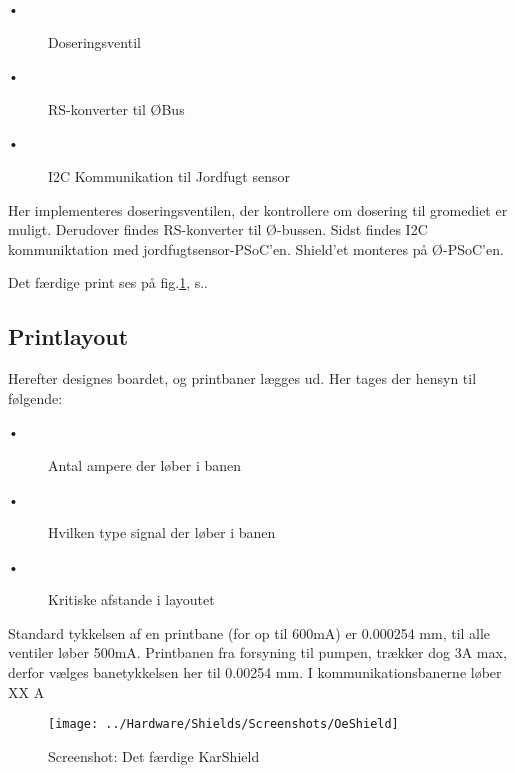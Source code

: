 \begin{description}
 \item[•] Doseringsventil
 \item[•] RS-konverter til ØBus
 \item[•] I2C Kommunikation til Jordfugt sensor
\end{description}

Her implementeres doseringsventilen, der kontrollere om dosering til gromediet er muligt. Derudover findes RS-konverter til Ø-bussen. Sidst findes I2C kommuniktation med jordfugtsensor-PSoC'en. 
Shield'et monteres på Ø-PSoC'en.

Det færdige print ses på fig.\ref{screenshot:OeShield}, s.\pageref{screenshot:OeShield}.

\subsection{Printlayout}

Herefter designes boardet, og printbaner lægges ud. Her tages der hensyn til følgende: 

\begin{description}
 \item[•] Antal ampere der løber i banen
 \item[•] Hvilken type signal der løber i banen
 \item[•] Kritiske afstande i layoutet
\end{description}

Standard tykkelsen af en printbane (for op til 600mA) er 0.000254 mm, til alle ventiler løber 500mA. Printbanen fra forsyning til pumpen, trækker dog 3A max, derfor vælges banetykkelsen her til 0.00254 mm.
I kommunikationsbanerne løber XX A

\newpage
\begin{figure}[H]
	\centering
	\texttt{[image: ../Hardware/Shields/Screenshots/OeShield]}
	\caption{Screenshot: Det færdige KarShield}
	\label{screenshot:OeShield}
\end{figure}

